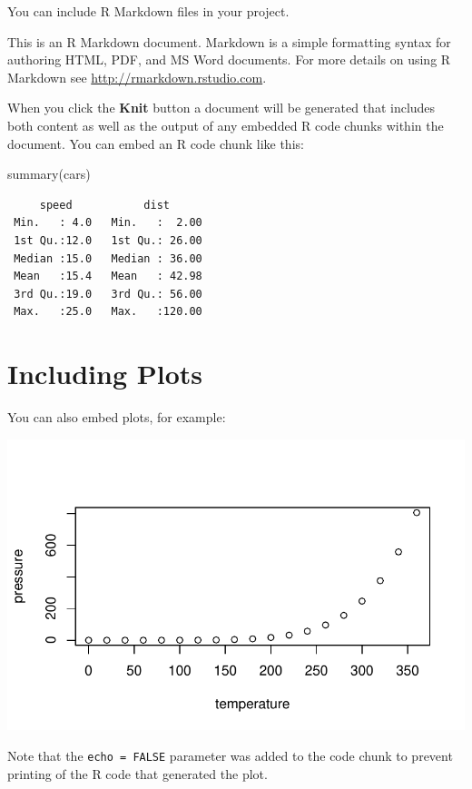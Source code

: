\documentclass[
  letterpaper,
  oneside,
  open=any]{scrbook}
\newenvironment{Shaded}{\begin{snugshade}}{\end{snugshade}}
\newcommand{\FunctionTok}[1]{\textcolor[rgb]{0.28,0.35,0.67}{#1}}
\newcommand{\NormalTok}[1]{\textcolor[rgb]{0.00,0.23,0.31}{#1}}
\begin{document}
You can include R Markdown files in your project.

This is an R Markdown document. Markdown is a simple formatting syntax
for authoring HTML, PDF, and MS Word documents. For more details on
using R Markdown see \url{http://rmarkdown.rstudio.com}.

When you click the \textbf{Knit} button a document will be generated
that includes both content as well as the output of any embedded R code
chunks within the document. You can embed an R code chunk like this:

\begin{Shaded}
\begin{Highlighting}[]
\FunctionTok{summary}\NormalTok{(cars)}
\end{Highlighting}
\end{Shaded}

\begin{verbatim}
     speed           dist       
 Min.   : 4.0   Min.   :  2.00  
 1st Qu.:12.0   1st Qu.: 26.00  
 Median :15.0   Median : 36.00  
 Mean   :15.4   Mean   : 42.98  
 3rd Qu.:19.0   3rd Qu.: 56.00  
 Max.   :25.0   Max.   :120.00  
\end{verbatim}

\hypertarget{including-plots}{%
\section{Including Plots}\label{including-plots}}

You can also embed plots, for example:

\includegraphics{content/rmarkdown_files/figure-pdf/pressure-1.pdf}

Note that the \texttt{echo\ =\ FALSE} parameter was added to the code
chunk to prevent printing of the R code that generated the plot.
\end{document}
